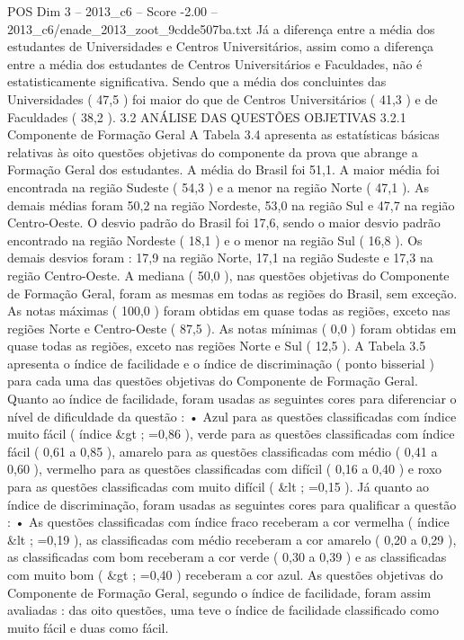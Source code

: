 \begin{textsample}{POS Dim 3 – 2013\_c6 – Score -2.00 – 2013\_c6/enade\_2013\_zoot\_9cdde507ba.txt}
Já a diferença entre a média dos estudantes de Universidades e Centros Universitários, assim como a diferença entre a média dos estudantes de Centros Universitários e Faculdades, não é estatisticamente significativa.
Sendo que a média dos concluintes das Universidades ( 47,5 ) foi maior do que de Centros Universitários ( 41,3 ) e de Faculdades ( 38,2 ). 3.2 ANÁLISE DAS QUESTÕES OBJETIVAS 3.2.1 Componente de Formação Geral A Tabela 3.4 apresenta as estatísticas básicas relativas às oito questões objetivas do componente da prova que abrange a Formação Geral dos estudantes.
A média do Brasil foi 51,1.
A maior média foi encontrada na região Sudeste ( 54,3 ) e a menor na região Norte ( 47,1 ).
As demais médias foram 50,2 na região Nordeste, 53,0 na região Sul e 47,7 na região Centro-Oeste.
O desvio padrão do Brasil foi 17,6, sendo o maior desvio padrão encontrado na região Nordeste ( 18,1 ) e o menor na região Sul ( 16,8 ).
Os demais desvios foram : 17,9 na região Norte, 17,1 na região Sudeste e 17,3 na região Centro-Oeste.
A mediana ( 50,0 ), nas questões objetivas do Componente de Formação Geral, foram as mesmas em todas as regiões do Brasil, sem exceção.
As notas máximas ( 100,0 ) foram obtidas em quase todas as regiões, exceto nas regiões Norte e Centro-Oeste ( 87,5 ).
As notas mínimas ( 0,0 ) foram obtidas em quase todas as regiões, exceto nas regiões Norte e Sul ( 12,5 ).
A Tabela 3.5 apresenta o índice de facilidade e o índice de discriminação ( ponto bisserial ) para cada uma das questões objetivas do Componente de Formação Geral.
Quanto ao índice de facilidade, foram usadas as seguintes cores para diferenciar o nível de dificuldade da questão : • Azul para as questões classificadas com índice muito fácil ( índice \&gt ; =0,86 ), verde para as questões classificadas com índice fácil ( 0,61 a 0,85 ), amarelo para as questões classificadas com médio ( 0,41 a 0,60 ), vermelho para as questões classificadas com difícil ( 0,16 a 0,40 ) e roxo para as questões classificadas com muito difícil ( \&lt ; =0,15 ).
Já quanto ao índice de discriminação, foram usadas as seguintes cores para qualificar a questão : • As questões classificadas com índice fraco receberam a cor vermelha ( índice \&lt ; =0,19 ), as classificadas com médio receberam a cor amarelo ( 0,20 a 0,29 ), as classificadas com bom receberam a cor verde ( 0,30 a 0,39 ) e as classificadas com muito bom ( \&gt ; =0,40 ) receberam a cor azul.
As questões objetivas do Componente de Formação Geral, segundo o índice de facilidade, foram assim avaliadas : das oito questões, uma teve o índice de facilidade classificado como muito fácil e duas como fácil.

\end{textsample}
